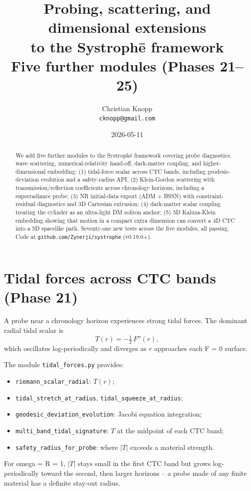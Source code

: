 \documentclass[11pt,a4paper]{article}
\title{\bfseries Probing, scattering, and dimensional extensions\\
to the Systroph\=e framework\\
\large Five further modules (Phases 21--25)}
\author{Christian Knopp\\\texttt{cknopp@gmail.com}}
\date{2026-05-11}
\begin{document}
\maketitle

\begin{abstract}
We add five further modules to the Systroph\=e framework covering
probe diagnostics, wave scattering, numerical-relativity hand-off,
dark-matter coupling, and higher-dimensional embedding:
(1) tidal-force scalar across CTC bands, including geodesic-deviation
evolution and a safety-radius API;
(2) Klein-Gordon scattering with transmission/reflection coefficients
across chronology horizons, including a superradiance probe;
(3) NR initial-data export (ADM + BSSN) with constraint-residual
diagnostics and 3D Cartesian extrusion;
(4) dark-matter scalar coupling treating the cylinder as an ultra-light
DM soliton anchor;
(5) 5D Kaluza-Klein embedding showing that motion in a compact extra
dimension can convert a 4D CTC into a 5D spacelike path.
Seventy-one new tests across the five modules, all passing.
Code at \texttt{github.com/Zynerji/systrophe} (v0.19.0+).
\end{abstract}

\section{Tidal forces across CTC bands (Phase 21)}

A probe near a chronology horizon experiences strong tidal forces.
The dominant radial tidal scalar is
\[
T(r) = -\tfrac{1}{2}\,F''(r),
\]
which oscillates log-periodically and diverges as $r$ approaches
each F = 0 surface.

The module \texttt{tidal\_forces.py} provides:
\begin{itemize}
\item \texttt{riemann\_scalar\_radial}: $T(r)$;
\item \texttt{tidal\_stretch\_at\_radius}, \texttt{tidal\_squeeze\_at\_radius};
\item \texttt{geodesic\_deviation\_evolution}: Jacobi equation integration;
\item \texttt{multi\_band\_tidal\_signature}: $T$ at the midpoint of each CTC band;
\item \texttt{safety\_radius\_for\_probe}: where $|T|$ exceeds a material strength.
\end{itemize}

For omega = R = 1, $|T|$ stays small in the first CTC band but grows
log-periodically toward the second, then larger horizons -- a probe
made of any finite material has a definite stay-out radius.
\end{document}
